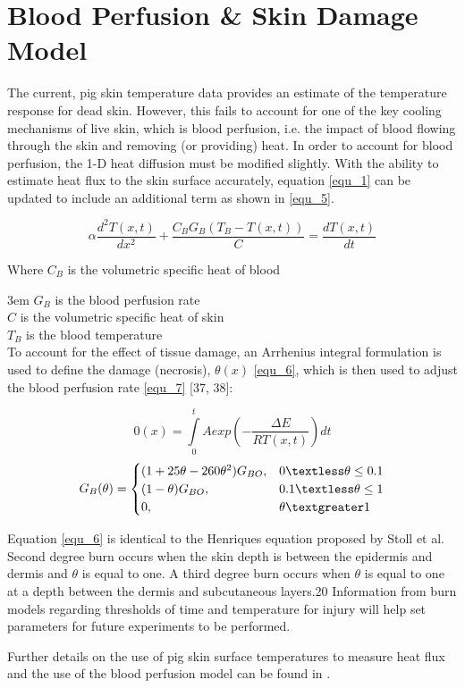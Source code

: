 \clearpage		\large
\chapter{Blood Perfusion \& Skin Damage Model} \label{App:blood_perfusion}

The current, pig skin temperature data provides an estimate of the temperature response for dead skin. However, this fails to account for one of the key cooling mechanisms of live skin, which is blood perfusion, i.e. the impact of blood flowing through the skin and removing (or providing) heat. In order to account for blood perfusion, the 1-D heat diffusion must be modified slightly. With the ability to estimate heat flux to the skin surface accurately, equation \ref{equ_1} can be updated to include an additional term as shown in \ref{equ_5}.

\begin{equation} \label{equ_5} \alpha \frac{d^2T(x,t)}{dx^2} + \frac{C_BG_B(T_B-T(x,t))}{C} = \frac{dT(x,t)}{dt} \end{equation}

Where $C_B$ is the volumetric specific heat of blood

\noindent\hangindent3em
$G_B$ is the blood perfusion rate\\
$C$ is the volumetric specific heat of skin\\
$T_B$ is the blood temperature\\

To account for the effect of tissue damage, an Arrhenius integral formulation is used to define the damage (necrosis), $\theta(x)$ \ref{equ_6}, which is then used to adjust the blood perfusion rate \ref{equ_7} [37, 38]:

\begin{equation} \label{equ_6} 0(x) = \int\limits_0^t A exp(-\frac{\Delta E}{RT(x,t)}) dt \end{equation}
\begin{equation} \label{equ_7} G_B(\theta) = 
\begin{cases}
(1+25\theta-260\theta^2)G_{BO}, 	& 0 \textless \theta \leq 0.1 \\
(1-\theta)G_{BO},					& 0.1 \textless \theta \leq 1 \\
0, 									& \theta \textgreater 1\\
\end{cases}
\end{equation}

Equation \ref{equ_6} is identical to the Henriques equation proposed by Stoll et al. Second degree burn occurs when the skin depth is between the epidermis and dermis and $\theta$ is equal to one. A third degree burn occurs when $\theta$ is equal to one at a depth between the dermis and subcutaneous layers.20 Information from burn models regarding thresholds of time and temperature for injury will help set parameters for future experiments to be performed.

Further details on the use of pig skin surface temperatures to measure heat flux and the use of the blood perfusion model can be found in \cite{Residential_Tenability}.


